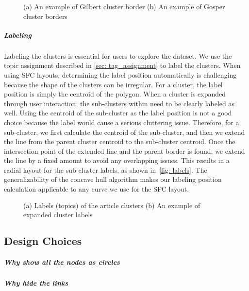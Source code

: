 \begin{figure}%
    \centering
    \qquad
    \caption{(a) An example of Gilbert cluster border (b) An example of Gosper cluster borders}%
    \label{fig: borders}%
\end{figure}
\subparagraph{Labeling}
Labeling the clusters is essential for users to explore the dataset.
We use the topic assignment described in \autoref{sec: tag_assignment} to label the clusters.
When using SFC layouts, determining the label position automatically is challenging because the shape of the clusters can be irregular.
For a cluster, the label position is simply the centroid of the polygon.
When a cluster is expanded through user interaction, the sub-clusters within need to be clearly labeled as well.
Using the centroid of the sub-cluster as the label position is not a good choice because the label would cause a serious cluttering issue.
Therefore, for a sub-cluster, we first calculate the centroid of the sub-cluster, and then we extend the line from the parent cluster centroid to the sub-cluster centroid. 
Once the intersection point of the extended line and the parent border is found, we extend the line by a fixed amount to avoid any overlapping issues.
This results in a radial layout for the sub-cluster labels, as shown in~\autoref{fig: labels}.
The generalizability of the concave hull algorithm makes our labeling position calculation applicable to any curve we use for the SFC layout.
\begin{figure}%
    \centering
    \qquad
    \caption{(a) Labels (topics) of the article clusters (b) An example of expanded cluster labels}%
    \label{fig: labels}%
\end{figure}

\subsection{Design Choices}
\subparagraph{Why show all the nodes as circles}
\subparagraph{Why hide the links}


